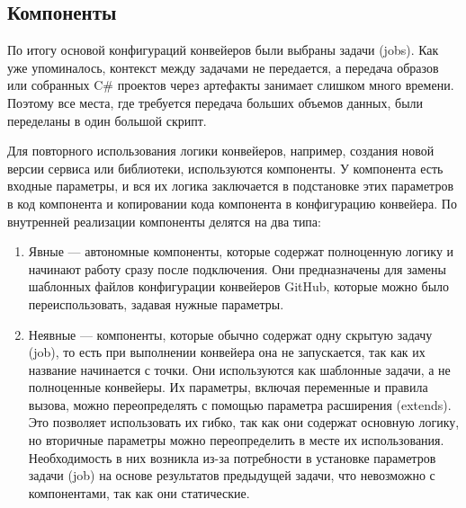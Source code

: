 \subsection{Компоненты} \label{subsec:components}
По итогу основой конфигураций конвейеров были выбраны задачи (jobs).
Как уже упоминалось, контекст между задачами не передается, а передача образов или собранных C\# проектов через артефакты занимает слишком много времени.
Поэтому все места, где требуется передача больших объемов данных, были переделаны в один большой скрипт.

Для повторного использования логики конвейеров, например, создания новой версии сервиса или библиотеки, используются компоненты.
У компонента есть входные параметры, и вся их логика заключается в подстановке этих параметров в код компонента и копировании кода компонента в конфигурацию конвейера.
По внутренней реализации компоненты делятся на два типа:
\begin{enumerate}
  \item Явные — автономные компоненты, которые содержат полноценную логику и начинают работу сразу после подключения.
  Они предназначены для замены шаблонных файлов конфигурации конвейеров GitHub, которые можно было переиспользовать, задавая нужные параметры.
  \item Неявные — компоненты, которые обычно содержат одну скрытую задачу (job), то есть при выполнении конвейера она не запускается, так как их название начинается с точки.
  Они используются как шаблонные задачи, а не полноценные конвейеры.
  Их параметры, включая переменные и правила вызова, можно переопределять с помощью параметра расширения (extends).
  Это позволяет использовать их гибко, так как они содержат основную логику, но вторичные параметры можно переопределить в месте их использования.
  Необходимость в них возникла из-за потребности в установке параметров задачи (job) на основе результатов предыдущей задачи, что невозможно с компонентами, так как они статические.
\end{enumerate}

